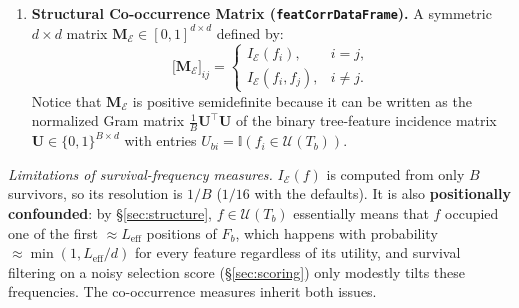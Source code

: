 \documentclass[11pt,a4paper]{article}
\newcommand{\code}[1]{\texttt{#1}}
\newcommand{\Ind}{\mathbb{I}}
\begin{document}
\begin{enumerate}[leftmargin=*, itemsep=4pt]
  \item \textbf{Structural Co-occurrence Matrix (\code{featCorrDataFrame}).} A symmetric $d \times d$ matrix $\mathbf{M}_{\mathcal{E}} \in [0, 1]^{d \times d}$ defined by:
  \begin{equation}
    \big[\mathbf{M}_{\mathcal{E}}\big]_{ij} =
    \begin{cases}
      I_{\mathcal{E}}(f_i), & i = j, \\
      I_{\mathcal{E}}(f_i, f_j), & i \neq j.
    \end{cases}
  \end{equation}
  Notice that $\mathbf{M}_{\mathcal{E}}$ is positive semidefinite because it can be written as the normalized Gram matrix $\frac{1}{B}\mathbf{U}^\top \mathbf{U}$ of the binary tree-feature incidence matrix $\mathbf{U} \in \{0, 1\}^{B \times d}$ with entries $U_{bi} = \Ind(f_i \in \mathcal{U}(T_b))$.
\end{enumerate}

\noindent\emph{Limitations of survival-frequency measures.} $I_{\mathcal{E}}(f)$ is computed from only $B$ survivors, so its resolution is $1/B$ ($1/16$ with the defaults). It is also \textbf{positionally confounded}: by \S\ref{sec:structure}, $f \in \mathcal{U}(T_b)$ essentially means that $f$ occupied one of the first $\approx L_{\text{eff}}$ positions of $F_b$, which happens with probability $\approx \min(1, L_{\text{eff}}/d)$ for every feature regardless of its utility, and survival filtering on a noisy selection score (\S\ref{sec:scoring}) only modestly tilts these frequencies. The co-occurrence measures inherit both issues.
\end{document}
